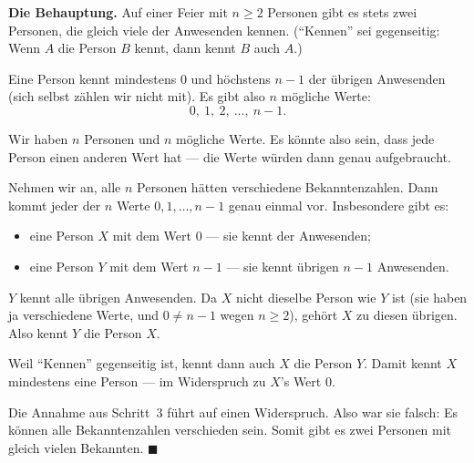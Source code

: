 \begin{merksatz}
\textbf{Die Behauptung.} Auf einer Feier mit $n \ge 2$ Personen gibt es stets zwei Personen, die gleich viele der Anwesenden kennen. (\enquote{Kennen} sei gegenseitig: Wenn $A$ die Person $B$ kennt, dann kennt $B$ auch $A$.)

Eine Person kennt mindestens $0$ und höchstens $n-1$ der übrigen Anwesenden (sich selbst zählen wir nicht mit). Es gibt also $n$ mögliche Werte:
\[ 0,\ 1,\ 2,\ \ldots,\ n-1 . \]

Wir haben $n$ Personen und $n$ mögliche Werte. Es könnte also sein, dass jede Person einen anderen Wert hat --- die Werte würden dann genau aufgebraucht.

Nehmen wir an, alle $n$ Personen hätten verschiedene Bekanntenzahlen. Dann kommt jeder der $n$ Werte $0, 1, \ldots, n-1$ genau einmal vor. Insbesondere gibt es:
\begin{itemize}[leftmargin=1.4em, itemsep=2pt]
\item eine Person $X$ mit dem Wert $0$ --- sie kennt  der Anwesenden;
\item eine Person $Y$ mit dem Wert $n-1$ --- sie kennt  übrigen $n-1$ Anwesenden.
\end{itemize}

$Y$ kennt alle übrigen Anwesenden. Da $X$ nicht dieselbe Person wie $Y$ ist (sie haben ja verschiedene Werte, und $0 \neq n-1$ wegen $n \ge 2$), gehört $X$ zu diesen übrigen. Also kennt $Y$ die Person $X$.

Weil \enquote{Kennen} gegenseitig ist, kennt dann auch $X$ die Person $Y$. Damit kennt $X$ mindestens eine Person --- im Widerspruch zu $X$'s Wert $0$.

Die Annahme aus Schritt~3 führt auf einen Widerspruch. Also war sie falsch: Es können  alle Bekanntenzahlen verschieden sein. Somit gibt es zwei Personen mit gleich vielen Bekannten. $\blacksquare$
\end{merksatz}

